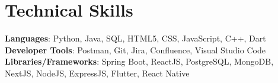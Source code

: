 \documentclass[letterpaper,11pt]{article}
\begin{document}
\section{Technical Skills}
 \begin{itemize}[leftmargin=0.15in, label={}]
    \small{\item{   
     \textbf{Languages}{: Python, Java, SQL, HTML5, CSS, JavaScript, C++, Dart} \\[1mm]
     \textbf{Developer Tools}{: Postman, Git, Jira, Confluence, Visual Studio Code} \\[1mm]
     \textbf{Libraries/Frameworks}{: Spring Boot, ReactJS, PostgreSQL, MongoDB, NextJS, NodeJS, ExpressJS, Flutter, React Native} \\ [1mm]
    }}
 \end{itemize}
 \vspace{-16pt}
 \vspace{3pt}
\vspace{10pt}

\vspace{-15pt}
\end{document}
